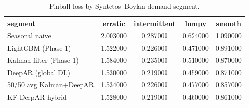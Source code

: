\begin{table}[t]
\caption{Pinball loss by Syntetos--Boylan demand segment.}
\label{tab:segment}
\begin{tabular}{lcccc}
\toprule
segment & erratic & intermittent & lumpy & smooth \\
\midrule
Seasonal naive & 2.003000 & 0.287000 & 0.624000 & 1.090000 \\
LightGBM (Phase 1) & 1.522000 & 0.226000 & 0.471000 & 0.891000 \\
Kalman filter (Phase 1) & 1.584000 & 0.235000 & 0.510000 & 0.870000 \\
DeepAR (global DL) & 1.530000 & 0.219000 & 0.459000 & 0.871000 \\
50/50 avg Kalman+DeepAR & 1.534000 & 0.226000 & 0.477000 & 0.857000 \\
KF-DeepAR hybrid & 1.528000 & 0.219000 & 0.460000 & 0.861000 \\
\bottomrule
\end{tabular}
\end{table}
